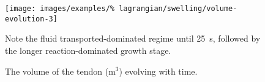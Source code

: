 \begin{figure}[!hpt]
  \begin{center}
    \texttt{[image: images/examples/\%
      lagrangian/swelling/volume-evolution-3]}
    \caption{The volume of the tendon (m$^3$) evolving with time.}
    \label{volume_evolution}
  \end{center}
      {Note the fluid transported-dominated regime until 25~s,
        followed by the longer reaction-dominated growth stage.}
\end{figure}

%

